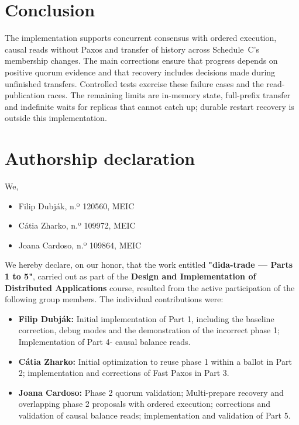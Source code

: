 \documentclass[times,10pt,twocolumn]{article}
\begin{document}
\section{Conclusion}
The implementation supports concurrent consensus with ordered execution,
causal reads without Paxos and transfer of history across Schedule~C's
membership changes. The main corrections ensure that progress depends on
positive quorum evidence and that recovery includes decisions made during
unfinished transfers. Controlled tests exercise these failure cases and the
read-publication races. The remaining limits are in-memory state, full-prefix
transfer and indefinite waits for replicas that cannot catch up; durable
restart recovery is outside this implementation.

\section*{Authorship declaration}

We,

\begin{itemize}\itemsep 0pt
\item Filip Dubják, n.º 120560, MEIC
\item Cátia Zharko, n.º 109972, MEIC
\item Joana Cardoso, n.º 109864, MEIC
\end{itemize}

We hereby declare, on our honor, that the work entitled \textbf{"dida-trade — Parts 1 to 5"},
carried out as part of the \textbf{Design and Implementation of Distributed Applications}
course, resulted from the active participation of the following group members.
The individual contributions were:

\begin{itemize}\itemsep 0pt
\item \textbf{Filip Dubják:} Initial implementation of Part 1, including the baseline correction, debug modes and the demonstration of the incorrect phase 1; Implementation of Part 4- causal balance reads.
\item \textbf{Cátia Zharko:} Initial optimization to reuse phase 1 within a ballot in Part 2; implementation and corrections of Fast Paxos in Part 3.
\item \textbf{Joana Cardoso:} Phase 2 quorum validation; Multi-prepare recovery and overlapping phase 2 proposals with ordered execution; corrections and validation of causal balance reads; implementation and validation of Part 5.
\end{itemize}
\end{document}
